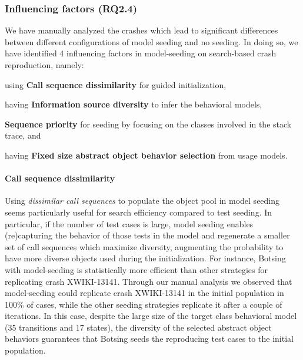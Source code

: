 \subsubsection{Influencing factors (\textbf{RQ2.4})}

We have manually analyzed the crashes which lead to significant differences between different configurations of model seeding and no seeding. In doing so, we have identified 4 influencing factors in model-seeding on search-based crash reproduction, namely:
%
\begin{inparaenum}[(i)]
\item using \textbf{Call sequence dissimilarity} for guided initialization,
\item having \textbf{Information source diversity} to infer the behavioral models,
\item \textbf{Sequence priority} for seeding by focusing on the classes involved in the stack trace, and
\item having \textbf{Fixed size abstract object behavior selection} from usage models.
\end{inparaenum}

\paragraph{Call sequence dissimilarity}
Using \emph{dissimilar call sequences} to populate the object pool in model seeding seems particularly useful for search efficiency compared to test seeding. In particular, if the number of test cases is large, model seeding enables (re)capturing the behavior of those tests in the model and regenerate a smaller set of call sequences which maximize diversity, augmenting the probability to have more diverse objects used during the initialization. For instance, Botsing with model-seeding is statistically more efficient than other strategies for replicating crash XWIKI-13141. Through our manual analysis we observed that model-seeding could replicate crash XWIKI-13141 in the initial population in 100\% of cases, while the other seeding strategies replicate it after a couple of iterations. In this case, despite the large size of the target class behavioral model  (35 transitions and 17 states), the diversity of the selected abstract object behaviors guarantees that Botsing seeds the reproducing test cases to the initial population.

